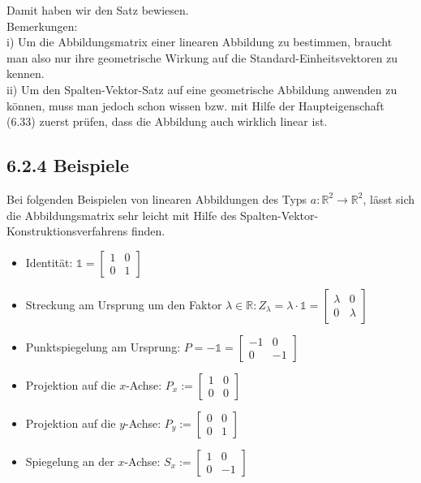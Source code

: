 \documentclass[10pt]{article}
\begin{document}
Damit haben wir den Satz bewiesen.\\
Bemerkungen:\\
i) Um die Abbildungsmatrix einer linearen Abbildung zu bestimmen, braucht man also nur ihre geometrische Wirkung auf die Standard-Einheitsvektoren zu kennen.\\
ii) Um den Spalten-Vektor-Satz auf eine geometrische Abbildung anwenden zu können, muss man jedoch schon wissen bzw. mit Hilfe der Haupteigenschaft (6.33) zuerst prüfen, dass die Abbildung auch wirklich linear ist.

\subsection*{6.2.4 Beispiele}
Bei folgenden Beispielen von linearen Abbildungen des Typs $a: \mathbb{R}^{2} \rightarrow \mathbb{R}^{2}$, lässt sich die Abbildungsmatrix sehr leicht mit Hilfe des Spalten-Vektor-Konstruktionsverfahrens finden.

\begin{itemize}
  \item Identität: $\mathbb{1}=\left[\begin{array}{ll}1 & 0 \\ 0 & 1\end{array}\right]$
  \item Streckung am Ursprung um den Faktor $\lambda \in \mathbb{R}: Z_{\lambda}=\lambda \cdot \mathbb{1}=\left[\begin{array}{cc}\lambda & 0 \\ 0 & \lambda\end{array}\right]$
  \item Punktspiegelung am Ursprung: $P=-\mathbb{1}=\left[\begin{array}{rr}-1 & 0 \\ 0 & -1\end{array}\right]$
  \item Projektion auf die $x$-Achse: $P_{x}:=\left[\begin{array}{ll}1 & 0 \\ 0 & 0\end{array}\right]$
  \item Projektion auf die $y$-Achse: $P_{y}:=\left[\begin{array}{ll}0 & 0 \\ 0 & 1\end{array}\right]$
  \item Spiegelung an der $x$-Achse: $S_{x}:=\left[\begin{array}{rr}1 & 0 \\ 0 & -1\end{array}\right]$
\end{itemize}
\end{document}
